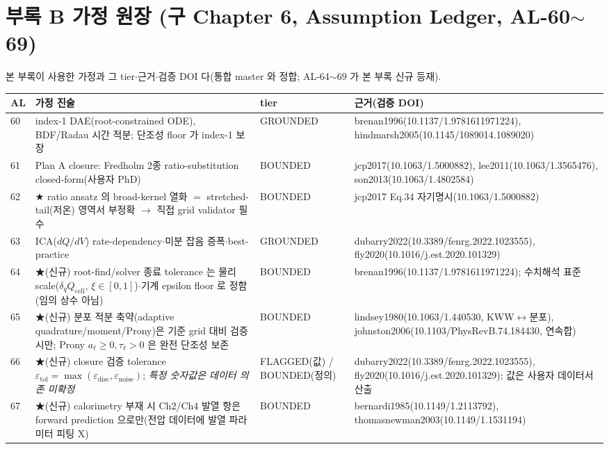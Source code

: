 \documentclass[11pt,a4paper]{article}
\newcommand{\cell}{\mathrm{cell}}
\newcommand{\tol}{\mathrm{tol}}
\newcommand{\noise}{\mathrm{noise}}
\newcommand{\brk}{\discretionary{}{}{}}%
\begin{document}
\section{부록 B 가정 원장 (구 Chapter 6, Assumption Ledger, AL-60$\sim$69)}\label{sec:ch6_al}
본 부록이 사용한 가정과 그 tier$\cdot$근거$\cdot$검증 DOI 다(통합 master 와 정합; AL-64$\sim$69 가 본 부록 신규 등재).
{\small
\begin{longtable}{p{} p{} p{} p{}}
\toprule AL & 가정 진술 & tier & 근거(검증 DOI) \\ \midrule \endhead
60 & index-1 DAE(root-constrained ODE), BDF/Radau 시간 적분; 단조성 floor 가 index-1 보장 & GROUNDED & brenan1996(10.1137/\brk 1.9781611971224), hindmarsh2005(10.1145/\brk 1089014.1089020) \\
61 & Plan A closure: Fredholm 2종 ratio-substitution closed-form(사용자 PhD) & BOUNDED & jcp2017(10.1063/\brk 1.5000882), lee2011(10.1063/\brk 1.3565476), son2013(10.1063/\brk 1.4802584) \\
62 & ★ ratio ansatz 의 broad-kernel 열화 $=$ stretched-tail(저온) 영역서 부정확 $\to$ 직접 grid validator 필수 & BOUNDED & jcp2017 Eq.34 자기명시(10.1063/\brk 1.5000882) \\
63 & ICA($dQ/dV$) rate-dependency$\cdot$미분 잡음 증폭$\cdot$best-practice & GROUNDED & dubarry2022(10.3389/\brk fenrg.2022.1023555), fly2020(10.1016/\brk j.est.2020.101329) \\
64 & ★(신규) root-find/solver 종료 tolerance 는 물리 scale($\delta_q Q_\cell$, $\xi\in[0,1]$)$\cdot$기계 epsilon floor 로 정함(임의 상수 아님) & BOUNDED & brenan1996(10.1137/\brk 1.9781611971224); 수치해석 표준 \\
65 & ★(신규) 분포 적분 축약(adaptive quadrature/moment/Prony)은 기준 grid 대비 검증 시만; Prony $a_\ell\ge0,\tau_\ell>0$ 은 완전 단조성 보존 & BOUNDED & lindsey1980(10.1063/\brk 1.440530, KWW$\leftrightarrow$분포), johnston2006(10.1103/\brk PhysRevB.74.184430, 연속합) \\
66 & ★(신규) closure 검증 tolerance $\varepsilon_\tol=\max(\varepsilon_{\mathrm{disc}},\varepsilon_\noise)$; \emph{특정 숫자값은 데이터 의존 미확정} & FLAGGED(값) / BOUNDED(정의) & dubarry2022(10.3389/\brk fenrg.2022.1023555), fly2020(10.1016/\brk j.est.2020.101329); 값은 사용자 데이터서 산출 \\
67 & ★(신규) calorimetry 부재 시 Ch2/Ch4 발열 항은 forward prediction 으로만(전압 데이터에 발열 파라미터 피팅 X) & BOUNDED & bernardi1985(10.1149/\brk 1.2113792), thomasnewman2003(10.1149/\brk 1.1531194) \\

\end{longtable}}
\end{document}
